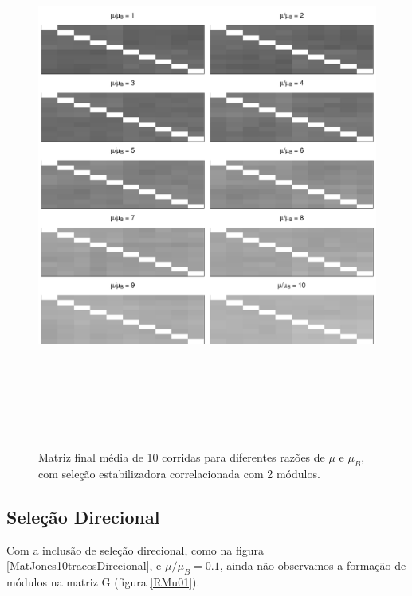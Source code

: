 \documentclass[a4paper, 12pt, titlepage, onecolumn]{article}
\numberwithin{equation}{section}
\numberwithin{table}{section}
\begin{document}
\begin{center}
\begin{figure}[H]
  \includegraphics[width=150mm, height=180mm]{figuras/MatBEstabRMu}
   \caption{Matriz final média de 10 corridas para diferentes razões de
   $\mu$ e $\mu_B$, com seleção estabilizadora correlacionada com 2
   módulos.}
  \label{MatBEstab}
\end{figure}
\end{center}


\subsection{Seleção Direcional}

Com a inclusão de seleção direcional, como na figura
\ref{MatJones10tracosDirecional}, e $\mu/\mu_B = 0.1$, ainda não
observamos a formação de módulos na matriz G (figura \ref{RMu01}). 
\end{document}
